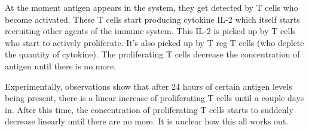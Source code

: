 At the moment antigen appears in the system, they get detected by T cells who become activated. These T cells start producing cytokine IL-2 which itself starts recruiting other agents of the immune system. This IL-2 is picked up by T cells who start to actively proliferate. It's also picked up by T reg T cells (who deplete the quantity of cytokine). The proliferating T cells decrease the concentration of antigen until there is no more.

Experimentally, observations show that after 24 hours of certain antigen levels being present, there is a linear increase of proliferating T cells until a couple days in. After this time, the concentration of proliferating T cells starts to suddenly decrease linearly until there are no more. It is unclear how this all works out.
